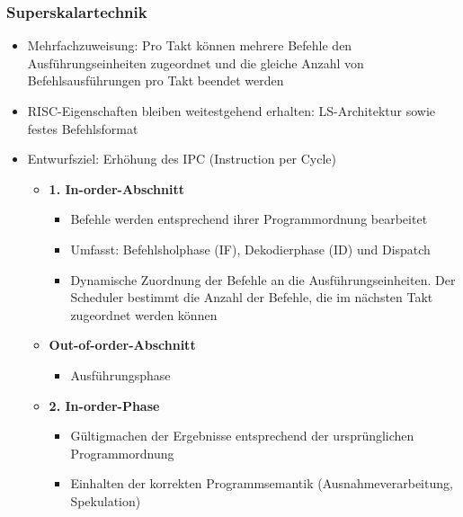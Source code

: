 \subsubsection{Superskalartechnik}
\begin{itemize}
	\item Mehrfachzuweisung: Pro Takt können mehrere Befehle den Ausführungseinheiten zugeordnet und die gleiche Anzahl von Befehlsausführungen pro Takt beendet werden
	\item RISC-Eigenschaften bleiben weitestgehend erhalten: LS-Architektur sowie festes Befehlsformat
	\item Entwurfsziel: Erhöhung des IPC (Instruction per Cycle)
	\begin{itemize}
		\item \textbf{1. In-order-Abschnitt}
		\begin{itemize}
			\item Befehle werden entsprechend ihrer Programmordnung bearbeitet
			\item Umfasst: Befehlsholphase (IF), Dekodierphase (ID) und Dispatch
			\item Dynamische Zuordnung der Befehle an die Ausführungseinheiten. Der Scheduler bestimmt die Anzahl der Befehle, die im nächsten Takt zugeordnet werden können
		\end{itemize}
		\item \textbf{Out-of-order-Abschnitt}
		\begin{itemize}
			\item Ausführungsphase
		\end{itemize}
		\item \textbf{2. In-order-Phase}
		\begin{itemize}
			\item Gültigmachen der Ergebnisse entsprechend der ursprünglichen Programmordnung
			\item Einhalten der korrekten Programmsemantik (Ausnahmeverarbeitung, Spekulation)
		\end{itemize}
	\end{itemize}
\end{itemize}

